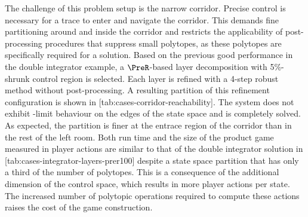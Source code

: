     The challenge of this problem setup is the narrow corridor.
    Precise control is necessary for a trace to enter and navigate the corridor.
    This demands fine partitioning around and inside the corridor and restricts the applicability of post-processing procedures that suppress small polytopes, as these polytopes are specifically required for a solution.
    Based on the previous good performance in the double integrator example, a $\PreR$-based layer decomposition with 5\%-shrunk control region is selected.
    Each layer is refined with a 4-step robust method without post-processing.
    A resulting partition of this refinement configuration is shown in [tab:cases-corridor-reachability].
    The system does not exhibit \epsilon-limit behaviour on the edges of the state space and is completely solved.
    As expected, the partition is finer at the entrace region of the corridor than in the rest of the left room.
    Both run time and the size of the product game measured in player actions are similar to that of the double integrator solution in [tab:cases-integrator-layers-prer100] despite a state space partition that has only a third of the number of polytopes.
    This is a consequence of the additional dimension of the control space, which results in more player actions per state.
    The increased number of polytopic operations required to compute these actions raises the cost of the game construction.

\stopsubsection


\startsubsection[title={Reachability Controller},reference=sec:cases-corridor-synthesis]


